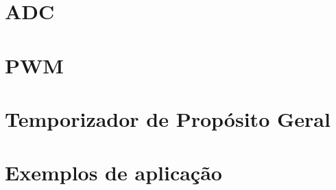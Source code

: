 \documentclass[a4paper,10pt,oneside]{book}
\begin{document}
\chapter{ADC}


\chapter{PWM}


\chapter{Temporizador de Propósito Geral}



\chapter{Exemplos de aplicação}





\end{document}

